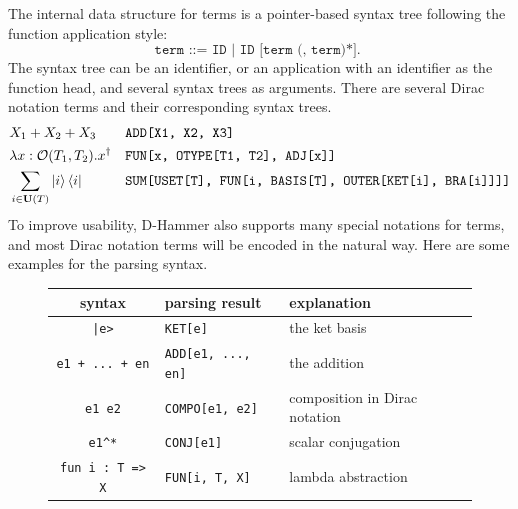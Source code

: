 The internal data structure for terms is a pointer-based syntax tree following the function application style:
\[
    \texttt{
        term ::= ID | ID [term (, term)*].
    }
\]
The syntax tree can be an identifier, or an application with an identifier as the function head, and several syntax trees as arguments. There are several Dirac notation terms and their corresponding syntax trees.
\footnotesize{
\begin{align*}
    & X_1 + X_2 + X_3 && \texttt{ADD[X1, X2, X3]} 
    \\
    & \lambda x: \mathcal{O}(T_1,  T_2). x^\dagger && \texttt{FUN[x, OTYPE[T1, T2], ADJ[x]]}
    \\
    & \sum_{i \in \mathbf{U}(T)} \ket{i} \bra{i} && \texttt{SUM[USET[T], FUN[i, BASIS[T], OUTER[KET[i], BRA[i]]]]}
\end{align*}
}
To improve usability, D-Hammer also supports many special notations for terms,  and most Dirac notation terms will be encoded in the natural way.
Here are some examples for the parsing syntax.

\begin{figure}
    \center
\begin{tabular}{c >{\centering\arraybackslash}p{4cm} l}
    \hline
    syntax & parsing result & explanation \\
    \hline
    \texttt{|e>} & \texttt{KET[e]} & the ket basis\\
    \texttt{e1 + ... + en} & \texttt{ADD[e1, ..., en]} & the addition\\
    \texttt{e1\ e2} & \texttt{COMPO[e1, e2]} & composition in Dirac notation \\
    \texttt{e1\^{}*} & \texttt{CONJ[e1]} & scalar conjugation \\
    \texttt{fun i : T => X} & \texttt{FUN[i, T, X]} & lambda abstraction \\
    \hline
\end{tabular}
\end{figure}

